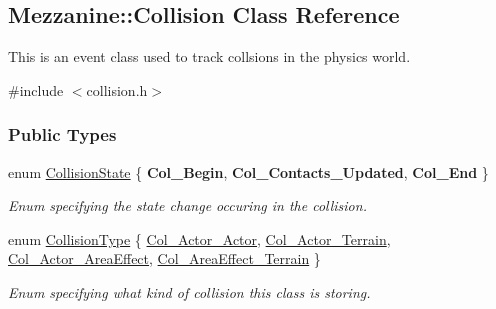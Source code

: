 \hypertarget{classMezzanine_1_1Collision}{
\subsection{Mezzanine::Collision Class Reference}
\label{classMezzanine_1_1Collision}
}


This is an event class used to track collsions in the physics world.  




{\ttfamily \#include $<$collision.h$>$}

\subsubsection*{Public Types}
\begin{DoxyCompactItemize}
\item 
enum \hyperlink{classMezzanine_1_1Collision_a24094c597061743dcd571f36077f4d19}{CollisionState} \{ {\bfseries Col\_\-Begin}, 
{\bfseries Col\_\-Contacts\_\-Updated}, 
{\bfseries Col\_\-End}
 \}
\begin{DoxyCompactList}\small\item\em Enum specifying the state change occuring in the collision. \item\end{DoxyCompactList}\item 
enum \hyperlink{classMezzanine_1_1Collision_aacdbb06153734d3645f4c806dbf90153}{CollisionType} \{ \hyperlink{classMezzanine_1_1Collision_aacdbb06153734d3645f4c806dbf90153a02aba47edf804a1f74605b2a18c5fea6}{Col\_\-Actor\_\-Actor}, 
\hyperlink{classMezzanine_1_1Collision_aacdbb06153734d3645f4c806dbf90153a06281a4725aae432fea2d878ed664b87}{Col\_\-Actor\_\-Terrain}, 
\hyperlink{classMezzanine_1_1Collision_aacdbb06153734d3645f4c806dbf90153a35f141cb89933c3b6f42cb6c022bfac0}{Col\_\-Actor\_\-AreaEffect}, 
\hyperlink{classMezzanine_1_1Collision_aacdbb06153734d3645f4c806dbf90153af9b276afb2ed485927a7fb81ca85e23c}{Col\_\-AreaEffect\_\-Terrain}
 \}
\begin{DoxyCompactList}\small\item\em Enum specifying what kind of collision this class is storing. \item\end{DoxyCompactList}\end{DoxyCompactItemize}
